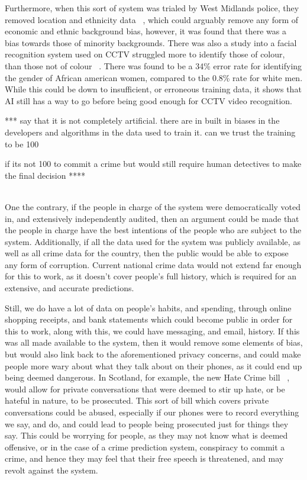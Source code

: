 Furthermore, when this sort of system was trialed by West Midlands police, they removed location and ethnicity data
~\cite{wmp-trial}, which could arguably remove any form of economic and ethnic background bias, however, it was
found that there was a bias towards those of minority backgrounds.
There was also a study into a facial recognition system used on CCTV struggled more to identify those of colour,
than those not of colour ~\cite{ifsec-bias-article}.
There was found to be a 34\% error rate for identifying the gender of African american women, compared to the
0.8\% rate for white men.
While this could be down to insufficient, or erroneous training data, it shows that AI still has a way to go before
being good enough for CCTV video recognition.

*** say that it is not completely artificial. there are in built in biases in the developers and algorithms in the data used to train it. can we trust
the training to be 100%

if its not 100%
to commit a crime but would still require human detectives to make the final decision
****

\\

One the contrary, if the people in charge of the system were democratically voted in, and extensively independently
audited, then an argument could be made that the people in charge have the best intentions of the people who are
subject to the system.
Additionally, if all the data used for the system was publicly available, as well as all crime data for the
country, then the public would be able to expose any form of corruption.
Current national crime data would not extend far enough for this to work, as it doesn't cover people's full history,
which is required for an extensive, and accurate predictions.

Still, we do have a lot of data on people's habits, and spending, through online shopping receipts, and bank statements
which could become public in order for this to work, along with this, we could have messaging, and email, history.
If this was all made available to the system, then it would remove some elements of bias, but would also link back to
the aforementioned privacy concerns, and could make people more wary about what they talk about on their phones, as
it could end up being deemed dangerous.
In Scotland, for example, the new Hate Crime bill  ~\cite{hate-crime-bill}, would allow for private conversations that
were deemed to stir up hate, or be hateful in nature, to be prosecuted.
This sort of bill which covers private conversations could be abused, especially if our phones were to record
everything we say, and do, and could lead to people being prosecuted just for things they say.
This could be worrying for people, as they may not know what is deemed offensive, or in the case of a crime prediction
system, conspiracy to commit a crime, and hence they may feel that their free speech is threatened, and may revolt
against the system.


